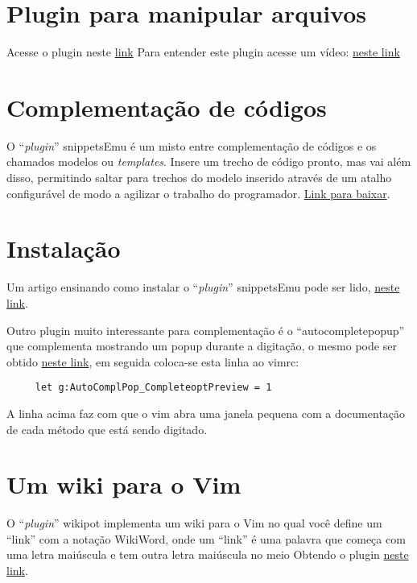 \section{Plugin para manipular arquivos}
Acesse o plugin neste
\href{http://www.vim.org/scripts/script.php?script\_id=2337#0.1.9}{link}
Para entender este plugin acesse um vídeo:
 \href{http://www.screencast.com/t/P6nJkJ0DE}{neste link}


\section{Complementação de códigos}
\label{Complementação de códigos}

O ``{\em plugin}'' snippetsEmu é um misto entre complementação de códigos e
os chamados modelos ou {\em templates}. Insere um trecho de código pronto,
mas vai além disso, permitindo saltar para trechos do modelo inserido
através de um atalho configurável de modo a agilizar o trabalho do
programador. \href{http://www.vim.org/scripts/script.php?script\_id=1318}{Link para baixar}.

\section{Instalação}
\label{Instalação}

Um artigo ensinando como instalar o ``{\em plugin}'' snippetsEmu pode ser lido,
\href{http://vivaotux.blogspot.com/2008/03/instalando-o-plugin-snippetsemu-no-vim.html}{neste link}.

Outro plugin muito interessante para complementação é o ``autocompletepopup'' que complementa 
mostrando um popup durante a digitação, o mesmo pode ser obtido 
\href{http://www.vim.org/scripts/script.php?script\_id=1879}{neste link}, em seguida coloca-se esta 
linha ao vimrc:

\begin{verbatim}
     let g:AutoComplPop_CompleteoptPreview = 1
\end{verbatim}

A linha acima faz com que o vim abra uma janela pequena com a documentação
de cada método que está sendo digitado.

\section{Um wiki para o Vim}
\label{sec:Um wiki para o Vim}

O ``{\em plugin}'' wikipot implementa um wiki para o Vim no qual você define
um ``link'' com a notação WikiWord, onde um ``link'' é uma palavra que
começa com uma letra maiúscula e tem outra letra maiúscula no meio
Obtendo o plugin  \href{http://www.vim.org/scripts/script.php?script\_id=1018}{neste link}.


